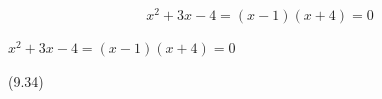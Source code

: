 {\begin{mdframed}[linewidth=4, leftmargin=40, rightmargin=40]
\begin{exercise}
\begin{enumerate}[noitemsep, label=\textbf{Step} \textbf{\arabic*}. ]
{\begin{equation}
    {x}^{2}+3x-4=\left(x-1\right)\left(x+4\right)=0\tag{9.34}
      \end{equation}
    }{%
    \setlength{\mymathboxwidth}{\columnwidth}
      \addtolength{\mymathboxwidth}{-48pt}
    \par\vspace{12pt}\noindent\begin{minipage}{\columnwidth}
    \parbox[t]{\mymathboxwidth}{\large\begin{math}
    {x}^{2}+3x-4=\left(x-1\right)\left(x+4\right)=0\end{math}}\hfill
    \parbox[t]{48pt}{\raggedleft 
    (9.34)}
    \end{minipage}\vspace{12pt}\par
    }%
    

\end{enumerate}
\end{exercise}
\end{mdframed}}
